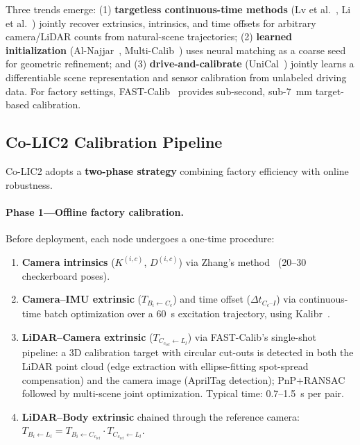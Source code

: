 Three trends emerge: (1) \textbf{targetless continuous-time methods}
(Lv et al.~\cite{lv2025targetless}, Li et al.~\cite{li2024twostep}) jointly
recover extrinsics, intrinsics, and time offsets for arbitrary camera/LiDAR
counts from natural-scene trajectories; (2) \textbf{learned initialization}
(Al-Najjar~\cite{alnajjar2026joint}, Multi-Calib~\cite{hu2025multicalib})
uses neural matching as a coarse seed for geometric refinement; and
(3) \textbf{drive-and-calibrate} (UniCal~\cite{yang2024unical}) jointly
learns a differentiable scene representation and sensor calibration from
unlabeled driving data. For factory settings, FAST-Calib~\cite{zheng2026fastcalib}
provides sub-second, sub-7~mm target-based calibration.

\subsection{Co-LIC2 Calibration Pipeline}

Co-LIC2 adopts a \textbf{two-phase strategy} combining factory efficiency with
online robustness.

\paragraph{Phase 1---Offline factory calibration.} Before deployment, each
node undergoes a one-time procedure:

\begin{enumerate}
  \item \textbf{Camera intrinsics} ($K^{(i,c)}$, $D^{(i,c)}$) via Zhang's
    method~\cite{zhang2000flexible} (20--30 checkerboard poses).
  \item \textbf{Camera--IMU extrinsic} ($T_{B_i\leftarrow C_c}$) and
    time offset ($\Delta t_{C_c\text{--}I}$) via continuous-time batch
    optimization over a 60~s excitation trajectory, using
    Kalibr~\cite{rehder2016kalibr}.
  \item \textbf{LiDAR--Camera extrinsic} ($T_{C_{c_{\text{ref}}}\leftarrow L_l}$)
    via FAST-Calib's single-shot pipeline: a 3D calibration target with
    circular cut-outs is detected in both the LiDAR point cloud (edge
    extraction with ellipse-fitting spot-spread compensation) and the
    camera image (AprilTag detection); PnP+RANSAC followed by multi-scene
    joint optimization. Typical time: 0.7--1.5~s per pair.
  \item \textbf{LiDAR--Body extrinsic} chained through the reference camera:
    $T_{B_i\leftarrow L_l}=T_{B_i\leftarrow C_{c_{\text{ref}}}}\cdot
    T_{C_{c_{\text{ref}}}\leftarrow L_l}$.
\end{enumerate}

